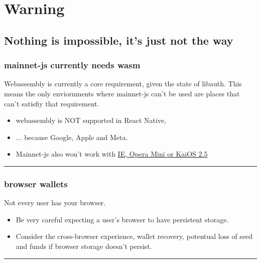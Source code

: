 \documentclass{beamer}
\begin{document}
\section{Warning}

\subsection[Not the way]{Nothing is impossible, it's just not the way}

\begin{frame}[fragile]
  \frametitle{mainnet-js currently needs wasm}

  Webassembly is currently a core requirement, given the state of libauth.  This 
  means the only enviornments where mainnet-js can't be used are places that can't satisfiy that requirement.
\begin{itemize}
  \item
    webassembly is \alert{NOT} supported in React Native,
  \item
    ... because Google, Apple and Meta. 
    \item
    Mainnet-js also won't work with \href{https://caniuse.com/wasm}{IE, Opera Mini or KaiOS 2.5}
  \end{itemize}
      
\rule{\textwidth}{0.9pt}
\end{frame}


\begin{frame}[fragile]
  \frametitle{browser wallets}

  Not every user has your browser.
\begin{itemize}
  \item
    Be very careful expecting a user's browser to have persistent storage.
  \item
    Consider the cross-browser experience, wallet recovery, potentual loss of seed and funds if browser storage doesn't persist.
  \end{itemize}
      
\rule{\textwidth}{0.9pt}
\end{frame}
\end{document}
